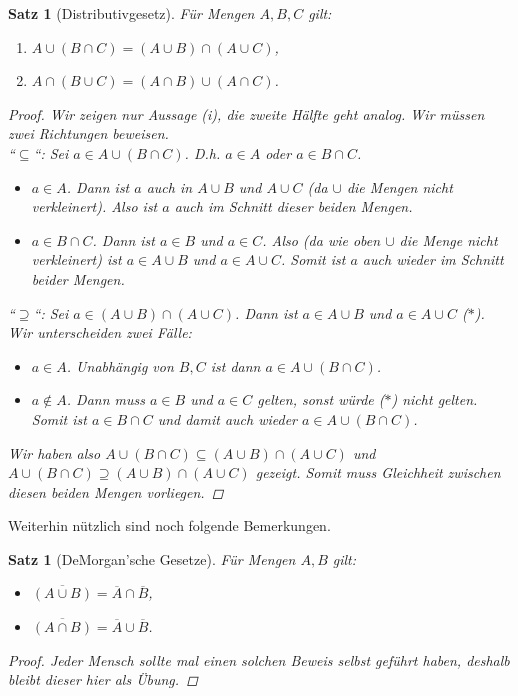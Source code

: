\documentclass[11pt, a4paper]{article}
\theoremstyle{definition}
\theoremstyle{plain}
\newtheorem{theorem}[definition]{Satz}
\numberwithin{equation}{section}
\newcommand{\comp}[1]{\overline{#1}}
\begin{document}
\begin{theorem}[Distributivgesetz]
	Für Mengen $A, B, C$ gilt:
	\begin{enumerate}
		\item $A \cup (B \cap C) = (A \cup B) \cap (A \cup C)$,
		\item $A \cap (B \cup C) = (A \cap B) \cup (A \cap C)$.
	\end{enumerate}
	\begin{proof}
		Wir zeigen nur Aussage (i), die zweite Hälfte geht analog. Wir müssen zwei Richtungen beweisen.\\
		``$\subseteq$``: Sei $a \in A \cup (B \cap C)$. D.h. $a \in A$ oder $a \in B \cap C$.
		\begin{itemize}
			\item $a \in A$. Dann ist $a$ auch in $A \cup B$ und $A \cup C$ (da $\cup$ die Mengen nicht verkleinert). Also ist $a$ auch im Schnitt dieser beiden Mengen.
			\item $a \in B \cap C$. Dann ist $a \in B$ und $a \in C$. Also (da wie oben $\cup$ die Menge nicht verkleinert) ist $a \in A \cup B$ und $a \in A \cup C$. Somit ist $a$ auch wieder im Schnitt beider Mengen.
		\end{itemize}
		``$\supseteq$``: Sei $a \in (A \cup B) \cap (A \cup C)$. Dann ist $a \in A \cup B$ und $a \in A \cup C$ ($\ast$). Wir unterscheiden zwei Fälle:
		\begin{itemize}
			\item $a \in A$. Unabhängig von $B, C$ ist dann $a \in A \cup (B \cap C)$.
			\item $a \notin A$. Dann muss $a \in B$ und $a \in C$ gelten, sonst würde ($\ast$) nicht gelten. Somit ist $a \in B \cap C$ und damit auch wieder $a \in A \cup (B \cap C)$. 
		\end{itemize}
		Wir haben also $A \cup (B \cap C) \subseteq (A \cup B) \cap (A \cup C)$ und $A \cup (B \cap C) \supseteq (A \cup B) \cap (A \cup C)$ gezeigt. Somit muss Gleichheit zwischen diesen beiden Mengen vorliegen.
	\end{proof}
\end{theorem}
Weiterhin nützlich sind noch folgende Bemerkungen.
\begin{theorem}[DeMorgan'sche Gesetze]
	Für Mengen $A, B$ gilt:
	\begin{itemize}
		\item $\comp{(A \cup B)} = \comp{A} \cap \comp{B}$,
		\item $\comp{(A \cap B)} = \comp{A} \cup \comp{B}$.
	\end{itemize}
	\begin{proof}
		Jeder Mensch sollte mal einen solchen Beweis selbst geführt haben, deshalb bleibt dieser hier als Übung.
	\end{proof}
\end{theorem}
\end{document}
